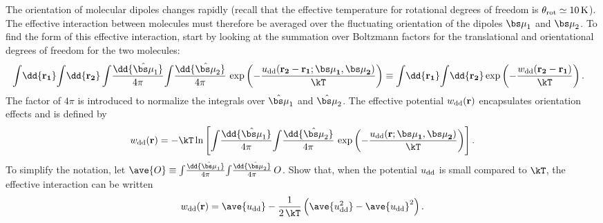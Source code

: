\smallskip \subp
The orientation of molecular dipoles changes rapidly 
(recall that the effective temperature for rotational degrees of freedom 
 is $\theta_{\rm rot} \simeq \rm10\,K$).
The effective interaction between molecules
must therefore be averaged over the fluctuating
orientation of the dipoles $\bmu_1$ and $\bmu_2$.
To find the form of this effective interaction,
start by looking at the summation over Boltzmann factors
for the translational and orientational degrees of freedom for the two molecules:
\begin{align*}
& \int\!\dd{\bf r_1} \!
\int\!\dd{\bf r_2}
\int\!\frac{\dd{{\hat \bmu}_1}}{4\pi} \!
\int\!\frac{\dd{{\hat \bmu}_2}}{4\pi} \,
\exp\left( -\frac{u_{\rm dd}(\bf r_2 - \bf r_1; \bmu_1, \bmu_2)}{\kT} \right)
\equiv  \int\!\dd{\bf r_1} \! \int\!\dd{\bf r_2}
\exp\left( -\frac{w_{\rm dd}(\bf r_2 - \bf r_1)}{\kT} \right) .
\end{align*}
The factor of $4\pi$ is introduced to normalize the
integrals over $\hat{\bmu}_1$ and $\hat{\bmu}_2$.
The effective potential $w_{\rm dd}(\bf r)$ 
encapsulates orientation effects and is defined by
$$
w_{\rm dd}({\bf r}) =
- \kT \ln \left[\int\!\frac{\dd{{\hat \bmu}_1}}{4\pi} \!
\int\!\frac{\dd{{\hat \bmu}_2}}{4\pi} \,
\exp\left( -\frac{u_{\rm dd}(\bf r; \bmu_1, \bmu_2)}{\kT} \right)\right] .
$$
To simplify the notation, let
$\ave{O} \equiv \int\!\frac{\dd{{\hat \bmu}_1}}{4\pi} \!
\int\!\frac{\dd{{\hat \bmu}_2}}{4\pi} \, O $.
Show that, when the potential $u_{\rm dd}$ is small compared to $\kT$,
the effective interaction can be written
$$ w_{\rm dd}({\bf r}) = \ave{u_{\rm dd}} - \frac{1}{2\,\kT}
\left( \ave{u_{\rm dd}^2}  - \ave{u_{\rm dd}}^2 \right) .$$

